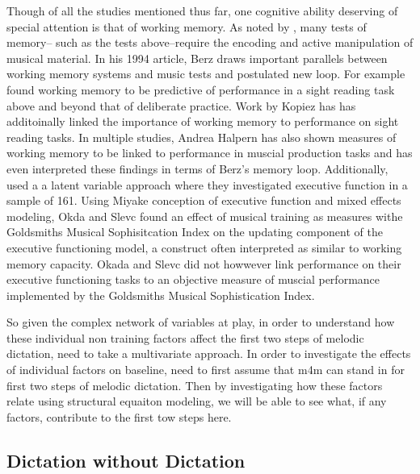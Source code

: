 \documentclass[]{book}
\begin{document}
Though of all the studies mentioned thus far, one cognitive ability deserving of special attention is that of working memory.
As noted by \citep{berzWorkingMemoryMusic1995}, many tests of memory-- such as the tests above--require the encoding and active manipulation of musical material.
In his 1994 article, Berz draws important parallels between working memory systems and music tests and postulated new loop.
For example \citep{meinzDeliberatePracticeNecessary2010} found working memory to be predictive of performance in a sight reading task above and beyond that of deliberate practice.
Work by Kopiez \citep{kopiezDynamicModelSkills2006, kopiezGeneralModelSkills2008} has has additoinally linked the importance of working memory to performance on sight reading tasks.
In multiple studies, Andrea Halpern has also shown measures of working memory to be linked to performance in muscial production tasks \citep{halpernEffectsTimbreTempo2008, nicholsScoreOneJazz2018b} and has even interpreted these findings in terms of Berz's memory loop.
Additionally, \citep{okadaIndividualDifferencesMusical2018a} used a a latent variable approach where they investigated executive function in a sample of 161.
Using Miyake conception of executive function and mixed effects modeling, Okda and Slevc found an effect of musical training as measures withe Goldsmiths Musical Sophisitcation Index on the updating component of the executive functioning model, a construct often interpreted as similar to working memory capacity.
Okada and Slevc did not howwever link performance on their executive functioning tasks to an objective measure of muscial performance implemented by the Goldsmiths Musical Sophistication Index.

So given the complex network of variables at play, in order to understand how these individual non training factors affect the first two steps of melodic dictation, need to take a multivariate approach.
In order to investigate the effects of individual factors on baseline, need to first assume that m4m can stand in for first two steps of melodic dictation.
Then by investigating how these factors relate using structural equaiton modeling, we will be able to see what, if any factors, contribute to the first tow steps here.

\hypertarget{dictation-without-dictation}{%
\subsection{Dictation without Dictation}\label{dictation-without-dictation}}
\end{document}
